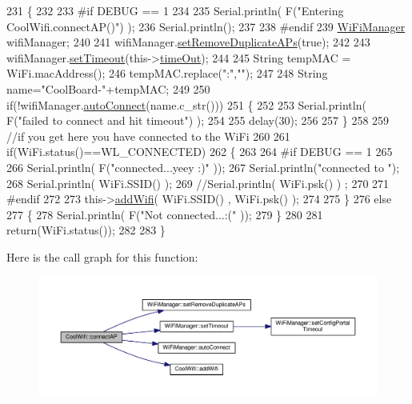 \begin{DoxyCode}
231 \{
232 
233 \textcolor{preprocessor}{#if DEBUG == 1 }
234     
235     Serial.println( F(\textcolor{stringliteral}{"Entering CoolWifi.connectAP()"}) );   
236     Serial.println();
237 
238 \textcolor{preprocessor}{#endif}
239     \hyperlink{class_wi_fi_manager}{WiFiManager} wifiManager;
240     
241     wifiManager.\hyperlink{class_wi_fi_manager_a4dd1dbf4f22900f226a3897b88155212}{setRemoveDuplicateAPs}(\textcolor{keyword}{true});
242 
243     wifiManager.\hyperlink{class_wi_fi_manager_aa6493d59c284ff245edb767ff684756d}{setTimeout}(this->\hyperlink{class_cool_wifi_a952111605f25156588b5632caaba1c6f}{timeOut});
244     
245     String tempMAC = WiFi.macAddress();
246     tempMAC.replace(\textcolor{stringliteral}{":"},\textcolor{stringliteral}{""});
247 
248     String name=\textcolor{stringliteral}{"CoolBoard-"}+tempMAC;   
249 
250     \textcolor{keywordflow}{if}(!wifiManager.\hyperlink{class_wi_fi_manager_ae3cdfa6b02edcfe63d7da4f696b62136}{autoConnect}(name.c\_str())) 
251     \{
252 
253         Serial.println( F(\textcolor{stringliteral}{"failed to connect and hit timeout"}) );
254 
255         delay(30);
256 
257     \} 
258 
259     \textcolor{comment}{//if you get here you have connected to the WiFi}
260 
261     \textcolor{keywordflow}{if}(WiFi.status()==WL\_CONNECTED)
262     \{
263 
264 \textcolor{preprocessor}{    #if DEBUG == 1}
265 
266         Serial.println( F(\textcolor{stringliteral}{"connected...yeey :)"} ));
267         Serial.println(\textcolor{stringliteral}{"connected to "});
268         Serial.println( WiFi.SSID() );
269         \textcolor{comment}{//Serial.println( WiFi.psk() ) ;}
270         
271 \textcolor{preprocessor}{    #endif}
272 
273         this->\hyperlink{class_cool_wifi_a914d7a1df14dd6b75345fb614c34e9d6}{addWifi}( WiFi.SSID() , WiFi.psk() );
274         
275     \}
276     \textcolor{keywordflow}{else}
277     \{
278         Serial.println( F(\textcolor{stringliteral}{"Not connected...:("} ));
279     \}
280     
281     \textcolor{keywordflow}{return}(WiFi.status());
282 
283 \}
\end{DoxyCode}
Here is the call graph for this function\+:\nopagebreak
\begin{figure}[H]
\begin{center}
\leavevmode
\includegraphics[width=350pt]{d7/d29/class_cool_wifi_a7c857f27161782f5ef1d62d552aff971_cgraph}
\end{center}
\end{figure}
